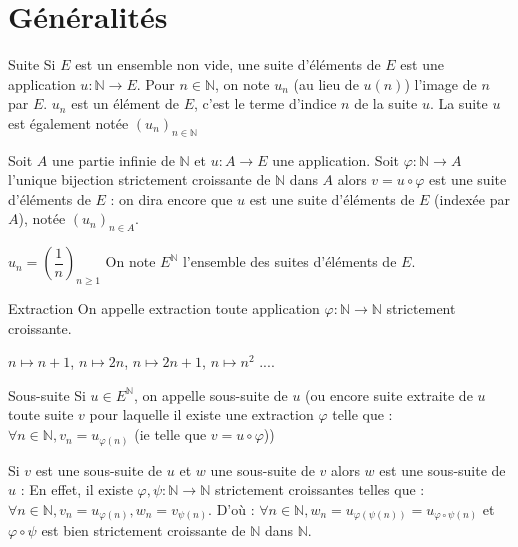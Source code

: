\documentclass[12pt,a4paper]{report}
\begin{document}
\section{Généralités}

\begin{definition}{Suite}{}
Si $E$ est un ensemble non vide, une suite d'éléments de $E$ est une application $u : \mathbb{N} \rightarrow E$. Pour $n \in \mathbb{N}$, on note $u_n$ (au lieu de $u(n)$) l'image de $n$ par $E$. $u_n$ est un élément de $E$, c'est le terme d'indice $n$ de la suite $u$. La suite $u$ est également notée $(u_n)_{n \in \mathbb{N}}$
\end{definition}

\begin{remarque}
Soit $A$ une partie infinie de $\mathbb{N}$ et $u : A \rightarrow E$ une application. Soit $\varphi : \mathbb{N} \rightarrow A$ l'unique bijection strictement croissante de $\mathbb{N}$ dans $A$ alors $v = u \circ \varphi$ est une suite d'éléments de $E$ : on dira encore que $u$ est une suite d'éléments de $E$ (indexée par $A$), notée $(u_n)_{n \in A}$. 
\end{remarque}

\begin{exemple}
$u_n = \left(\dfrac{1}{n}\right)_{n \geq 1}$
\newline On note $E^\mathbb{N}$ l'ensemble des suites d'éléments de $E$.
\end{exemple} 

\begin{definition}{Extraction}{}
On appelle extraction toute application $\varphi : \mathbb{N} \rightarrow \mathbb{N}$ strictement croissante.
\end{definition}

\begin{exemple}
$n \mapsto n+1$, $n \mapsto 2n$, $n \mapsto 2n+1$, $n \mapsto n^2$ ....
\end{exemple}

\begin{definition}{Sous-suite}{}
Si $u \in E^\mathbb{N}$, on appelle sous-suite de $u$ (ou encore suite extraite de $u$ toute suite $v$ pour laquelle il existe une extraction $\varphi$ telle que : $\forall n \in \mathbb{N}, v_n = u_{\varphi(n)}$ (ie telle que $v = u \circ \varphi$))
\end{definition}

\begin{remarque}
Si $v$ est une sous-suite de $u$ et $w$ une sous-suite de $v$ alors $w$ est une sous-suite de $u$ : 
\newline En effet, il existe $\varphi,\psi : \mathbb{N} \rightarrow \mathbb{N}$ strictement croissantes telles que : \newline $\forall n \in \mathbb{N}, v_n = u_{\varphi(n)}, w_n = v_{\psi(n)}$. 
\newline D'où : $\forall n \in \mathbb{N}, w_n = u_{\varphi(\psi(n))} = u_{\varphi \circ \psi (n)}$ et $\varphi \circ \psi$ est bien strictement croissante de $\mathbb{N}$ dans $\mathbb{N}$.
\end{remarque}
\end{document}
